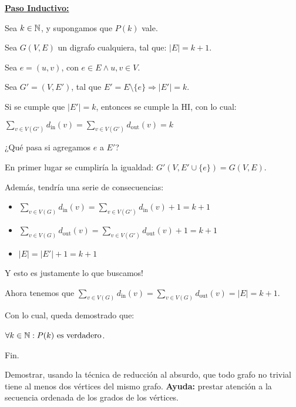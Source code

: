 \documentclass[12pt,a4paper]{article}
\begin{document}
\par \underline{\textbf{Paso Inductivo:}}
\par Sea \ensuremath{k \in \natt}, y supongamos que \ensuremath{P(k)} vale.
\par Sea \ensuremath{G(V, E)} un digrafo cualquiera, tal que: \ensuremath{|E| = k + 1}.
\par Sea \ensuremath{e = (u, v)}, con \ensuremath{e \in E \land u,v \in V}.
\par Sea \ensuremath{G'=(V, E')}, tal que \ensuremath{E'= E \setminus \{e\} \Rightarrow |E'| = k}.
\demoline
\par Si se cumple que \ensuremath{|E'|=k}, entonces se cumple la HI, con lo cual:
\par \ensuremath{\sum_{v \in V(G')} d_{\text{in}}(v) = \sum_{v \in V(G')} d_{\text{out}}(v) = k}
\demoline
\par ¿Qué pasa si agregamos \ensuremath{e} a \ensuremath{E'}?
\par En primer lugar se cumpliría la igualdad: \ensuremath{G'(V, E' \cup \{e\}) = G(V, E)}.
\par Además, tendría una serie de consecuencias:
\begin{groupIzq}{1em}
  \begin{itemize}
    \item \ensuremath{\sum_{v \in V(G)} d_{\text{in}}(v) = \sum_{v \in V(G')} d_{\text{in}}(v) + 1 = k + 1}
    \item \ensuremath{\sum_{v \in V(G)} d_{\text{out}}(v) = \sum_{v \in V(G')} d_{\text{out}}(v) + 1 = k + 1}
    \item \ensuremath{|E| = |E'| + 1 = k + 1}
  \end{itemize}
\end{groupIzq}
\par Y esto es justamente lo que buscamos!
\par Ahora tenemos que \ensuremath{\sum_{v \in V(G)} d_{\text{in}}(v) = \sum_{v \in V(G)} d_{\text{out}}(v) = |E| = k + 1}.
\par Con lo cual, queda demostrado que:
\par \ensuremath{\forall k \in \natt : P(k) \text{ es verdadero}}.

\demoline
\demoline
\par Fin.

\newpage

\par Demostrar, usando la técnica de reducción al absurdo, que todo grafo no trivial tiene al menos dos vértices del mismo grafo. \textbf{Ayuda:} prestar atención a la secuencia ordenada de los grados de los vértices.
\end{document}
